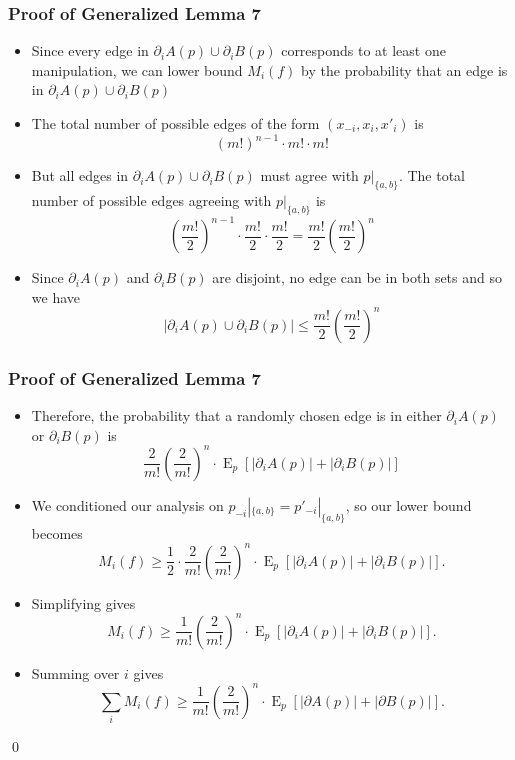 \documentclass[aspectratio=169]{beamer}
\DeclareMathOperator{\expectedvalue}{E}
\begin{document}
		\begin{frame}
			\frametitle{Proof of Generalized Lemma 7}

			\begin{itemize}
				\item Since every edge in $\partial_i A(p) \cup \partial_i B(p)$ corresponds to at least one manipulation, we can lower bound $M_i(f)$ by the probability that an edge is in $\partial_i A(p) \cup \partial_i B(p)$
				\item The total number of possible edges of the form $(x_{-i}, x_i, x'_i)$ is
					\[
						(m!)^{n-1} \cdot m! \cdot m!
					\]
				\item But all edges in $\partial_i A(p) \cup \partial_i B(p)$ must agree with $p|_{\{a, b\}}$. The total number of possible edges agreeing with $p|_{\{a, b\}}$ is
					\[
						\left(\frac{m!}{2}\right)^{n-1} \cdot \frac{m!}{2} \cdot \frac{m!}{2} = \frac{m!}{2}\left(\frac{m!}{2}\right)^{n}
					\]
				\item Since $\partial_i A(p)$ and $\partial_i B(p)$ are disjoint, no edge can be in both sets and so we have
					\[
						|\partial_i A(p) \cup \partial_i B(p)| \le \frac{m!}{2}\left(\frac{m!}{2}\right)^{n}
					\]
			\end{itemize}
		\end{frame}

		\begin{frame}
			\frametitle{Proof of Generalized Lemma 7}

			\begin{itemize}
				\item Therefore, the probability that a randomly chosen edge is in either $\partial_i A(p)$ or $\partial_i B(p)$ is
					\[
						\frac{2}{m!} \left(\frac{2}{m!}\right)^{n} \cdot \expectedvalue_p \left[ |\partial_i A(p)| + |\partial_i B(p)| \right]
					\]
				\item We conditioned our analysis on $p_{-i}|_{\{a,b\}} = p'_{-i}|_{\{a,b\}}$, so our lower bound becomes
					\[
						M_i(f) \ge \frac{1}{2} \cdot \frac{2}{m!}\left(\frac{2}{m!}\right)^{n} \cdot \expectedvalue_p \left[ |\partial_i A(p)| + |\partial_i B(p)| \right].
					\]
				\item Simplifying gives
					\[
						M_i(f) \ge \frac{1}{m!}\left(\frac{2}{m!}\right)^{n} \cdot \expectedvalue_p \left[ |\partial_i A(p)| + |\partial_i B(p)| \right].
					\]
				\item Summing over $i$ gives
					\[
						\sum_i M_i(f) \ge \frac{1}{m!}\left(\frac{2}{m!}\right)^{n} \cdot \expectedvalue_p \left[ |\partial A(p)| + |\partial B(p)| \right].
					\]
			\end{itemize}

			\qed
		\end{frame}
\end{document}
